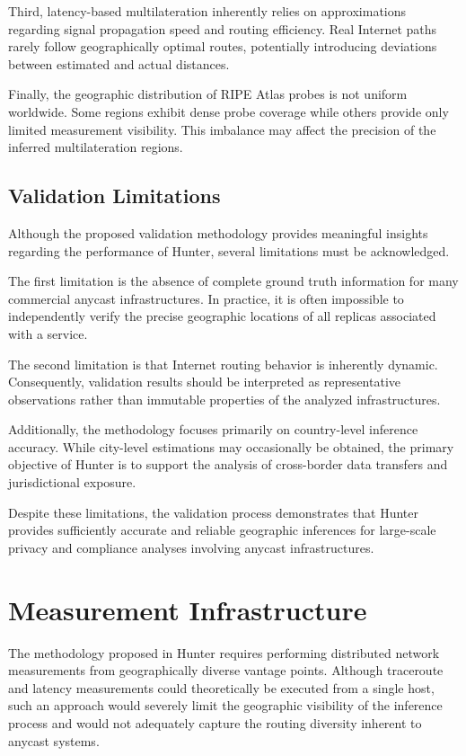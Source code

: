 Third, latency-based multilateration inherently relies on approximations regarding signal propagation speed and routing efficiency. Real Internet paths rarely follow geographically optimal routes, potentially introducing deviations between estimated and actual distances.

Finally, the geographic distribution of RIPE Atlas probes is not uniform worldwide. Some regions exhibit dense probe coverage while others provide only limited measurement visibility. This imbalance may affect the precision of the inferred multilateration regions.

\subsection{Validation Limitations}

Although the proposed validation methodology provides meaningful insights regarding the performance of Hunter, several limitations must be acknowledged.

The first limitation is the absence of complete ground truth information for many commercial anycast infrastructures. In practice, it is often impossible to independently verify the precise geographic locations of all replicas associated with a service.

The second limitation is that Internet routing behavior is inherently dynamic. Consequently, validation results should be interpreted as representative observations rather than immutable properties of the analyzed infrastructures.

Additionally, the methodology focuses primarily on country-level inference accuracy. While city-level estimations may occasionally be obtained, the primary objective of Hunter is to support the analysis of cross-border data transfers and jurisdictional exposure.

Despite these limitations, the validation process demonstrates that Hunter provides sufficiently accurate and reliable geographic inferences for large-scale privacy and compliance analyses involving anycast infrastructures.

\section{Measurement Infrastructure}
\label{sc:hunter_measurement_platform}

The methodology proposed in Hunter requires performing distributed network measurements from geographically diverse vantage points. Although traceroute and latency measurements could theoretically be executed from a single host, such an approach would severely limit the geographic visibility of the inference process and would not adequately capture the routing diversity inherent to anycast systems.

